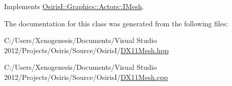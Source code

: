 Implements \hyperlink{class_osiris_i_1_1_graphics_1_1_actors_1_1_i_mesh_aba831f84999aa4b4c93a4af7910aeb17}{Osiris\-I\-::\-Graphics\-::\-Actors\-::\-I\-Mesh}.



The documentation for this class was generated from the following files\-:\begin{DoxyCompactItemize}
\item 
C\-:/\-Users/\-Xenogenesis/\-Documents/\-Visual Studio 2012/\-Projects/\-Osiris/\-Source/\-Osiris\-I/\hyperlink{_d_x11_mesh_8hpp}{D\-X11\-Mesh.\-hpp}\item 
C\-:/\-Users/\-Xenogenesis/\-Documents/\-Visual Studio 2012/\-Projects/\-Osiris/\-Source/\-Osiris\-I/\hyperlink{_d_x11_mesh_8cpp}{D\-X11\-Mesh.\-cpp}\end{DoxyCompactItemize}
